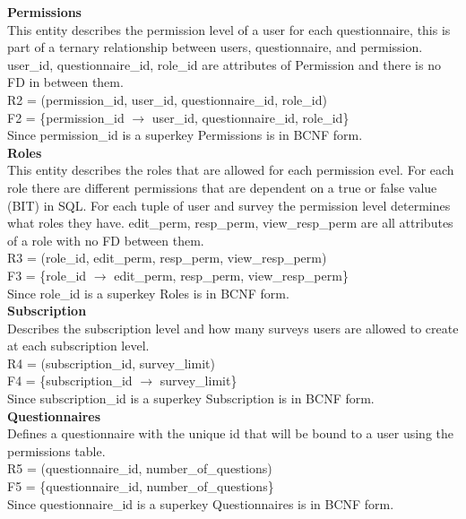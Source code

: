 \documentclass[12pt, oneside, a4paper]{article}
\newcommand{\tb}[1]{\textbf{#1}}
\begin{document}
    \tb{Permissions} \\
    This entity describes the permission level of a user for each 
    questionnaire, this is part of a ternary relationship between users, questionnaire, and permission. user\_id, questionnaire\_id, role\_id are attributes of Permission and there is no FD in between them. \\
    R2 = (permission\_id, user\_id, questionnaire\_id, role\_id) \\
    F2 = \{permission\_id \(\rightarrow\) user\_id, questionnaire\_id, role\_id\} \\
    Since permission\_id is a superkey Permissions is in BCNF form. 
    \\
    
    \tb{Roles} \\
    This entity describes the roles that are allowed for each permission evel. For each role there are different permissions that are dependent on a true or false value (BIT) in SQL. For each tuple of user and survey the permission level determines what roles they have. edit\_perm, resp\_perm, view\_resp\_perm are all attributes of a role with no FD between them. \\
    R3 = (role\_id, edit\_perm, resp\_perm, view\_resp\_perm) \\
    F3 = \{role\_id \(\rightarrow\) edit\_perm, resp\_perm, view\_resp\_perm\} \\
    Since role\_id is a superkey Roles is in BCNF form. 
    \\

    \tb{Subscription} \\
    Describes the subscription level and how many surveys users are allowed to create at each subscription level. \\
    R4 = (subscription\_id, survey\_limit) \\
    F4 = \{subscription\_id \(\rightarrow\) survey\_limit\} \\
    Since subscription\_id is a superkey Subscription is in BCNF form. 
    \\

    \tb{Questionnaires} \\
    Defines a questionnaire with the unique id that will be bound to a user using the permissions table. \\
    R5 = (questionnaire\_id, number\_of\_questions) \\
    F5 = \{questionnaire\_id, number\_of\_questions\} \\ 
    Since questionnaire\_id is a superkey Questionnaires is in BCNF form. 
    \\
\end{document}
